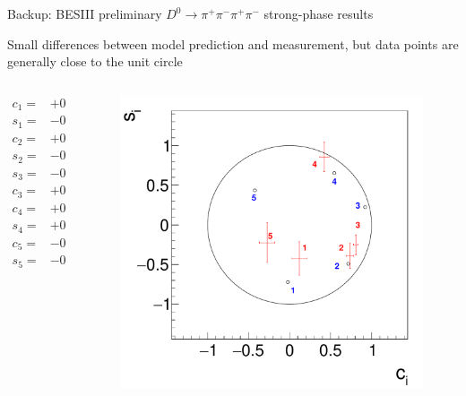 \documentclass[xcolor={dvipsnames}]{beamer}
\begin{document}
\begin{frame}{Backup: BESIII preliminary $D^0\to\pi^+\pi^-\pi^+\pi^-$ strong-phase results}
  \begin{center}
    Small differences between model prediction and measurement, but data points are generally close to the unit circle
  \end{center}
  \vspace{-0.3cm}
  \begin{columns}
    \begin{column}{0.50\textwidth}
      \vspace{-0.5cm}
      \begin{align*}
        c_1 =& +0.12 \pm 0.09 \pm 0.02 \\
        s_1 =& -0.42 \pm 0.21 \pm 0.04 \\
        c_2 =& +0.74 \pm 0.04 \pm 0.02 \\
        s_2 =& -0.39 \pm 0.16 \pm 0.06 \\
        s_3 =& -0.25 \pm 0.12 \pm 0.03 \\
        c_3 =& +0.81 \pm 0.03 \pm 0.01 \\
        c_4 =& +0.42 \pm 0.06 \pm 0.02 \\
        s_4 =& +0.86 \pm 0.19 \pm 0.07 \\
        c_5 =& -0.27 \pm 0.09 \pm 0.03 \\
        s_5 =& -0.22 \pm 0.25 \pm 0.08
      \end{align*}
    \end{column}
    \begin{column}{0.50\textwidth}
      \begin{figure}
        \centering
        \includegraphics[width=1.0\textwidth]{Plots/CiSiOptim.pdf}

\end{figure}
\end{column}
\end{columns}
\end{frame}
\end{document}
